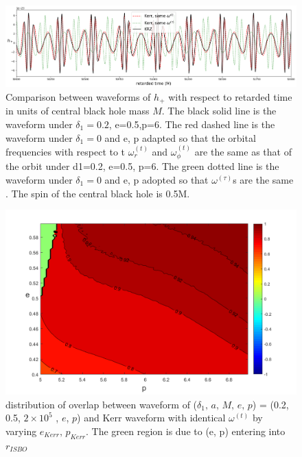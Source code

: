 \documentclass{article}
\begin{document}
\begin{figure}[!htb]
	\centering
	\includegraphics[width=16cm]{krz_kerr_wave.png}
	
	\caption{Comparison between waveforms of $h_+$ with respect to retarded time in units of central black hole mass $M$. The black solid line is the waveform under $\delta_1=0.2$, e=0.5,p=6. The red dashed line is the waveform under $\delta_1=0$ and e, p adapted so that the orbital frequencies with respect to t $\omega^{(t)}_r$ and $\omega^{(t)}_\phi$ are the same as that of the orbit under d1=0.2, e=0.5, p=6. The green dotted line is the waveform under $\delta_1 =0$ and e, p adopted so that $\omega^{(\tau)}$s are the same . The spin of the central black hole is 0.5M.}
	\label{kkwave}
\end{figure}	
	
	\begin{figure}[!htb]
		\centering
		\includegraphics[width=16cm]{ep_best_dist.png}
		
		\caption{distribution of overlap between waveform of ($\delta_1,\, a,\, M,\, e,\, p$) = (0.2, 0.5, $2 \times 10^5 $ , $e$, $p$) and Kerr waveform with identical $\omega^{(t)}$ by varying $e_{Kerr},\, p_{Kerr}$. The green region is due to (e, p) entering into $r_{ISBO}$ }
		\label{epdist}
	\end{figure}	
	
\end{document}
